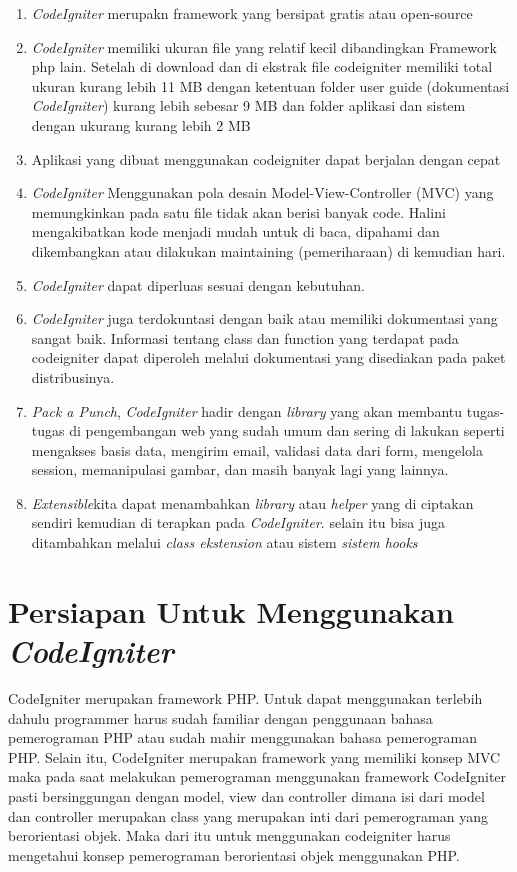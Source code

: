 \begin{enumerate}
\item \textit{CodeIgniter} merupakn framework yang bersipat gratis atau open-source
\item \textit{CodeIgniter} memiliki ukuran file yang relatif kecil dibandingkan Framework php lain. Setelah di download dan di ekstrak file codeigniter memiliki total ukuran kurang lebih 11 MB dengan ketentuan folder user guide (dokumentasi \textit{CodeIgniter}) kurang lebih sebesar 9 MB dan folder aplikasi dan sistem dengan ukurang kurang lebih 2 MB 
\item Aplikasi yang dibuat menggunakan codeigniter dapat berjalan dengan cepat
\item \textit{CodeIgniter} Menggunakan pola desain Model-View-Controller (MVC) yang memungkinkan pada satu file tidak akan berisi banyak code. Halini mengakibatkan kode menjadi mudah untuk di baca, dipahami dan dikembangkan atau dilakukan maintaining (pemeriharaan) di kemudian hari.
\item \textit{CodeIgniter} dapat diperluas sesuai dengan kebutuhan.
\item \textit{CodeIgniter} juga terdokuntasi dengan baik atau memiliki dokumentasi yang sangat baik. Informasi tentang class dan function yang terdapat pada codeigniter dapat diperoleh melalui dokumentasi yang disediakan pada paket distribusinya.
\item \textit{Pack a Punch}, \textit{CodeIgniter} hadir dengan \textit{library} yang akan membantu tugas-tugas di pengembangan web yang sudah umum dan sering di lakukan seperti mengakses basis data, mengirim email, validasi data dari form, mengelola session, memanipulasi gambar,  dan masih banyak lagi yang lainnya.
\item \textit{Extensible}kita dapat menambahkan \textit{library} atau \textit{helper} yang di ciptakan sendiri kemudian di terapkan pada \textit{CodeIgniter}. selain itu bisa juga ditambahkan melalui \textit{class ekstension} atau sistem \textit{sistem hooks} 
\end{enumerate}

\section{Persiapan Untuk Menggunakan \textit{CodeIgniter}}

CodeIgniter merupakan framework PHP. Untuk dapat menggunakan terlebih dahulu programmer harus sudah familiar dengan penggunaan bahasa pemerograman PHP atau sudah mahir menggunakan bahasa pemerograman PHP. Selain itu, CodeIgniter merupakan framework yang memiliki konsep MVC maka pada saat melakukan pemerograman menggunakan framework CodeIgniter pasti bersinggungan dengan model, view dan controller dimana isi dari model dan controller merupakan class yang merupakan inti dari pemerograman yang berorientasi objek. Maka dari itu untuk menggunakan codeigniter harus mengetahui konsep pemerograman berorientasi objek menggunakan PHP.\par

